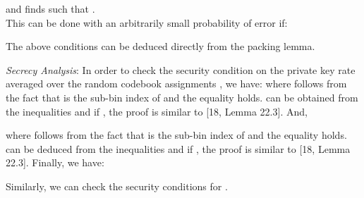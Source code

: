 \documentclass[conference,8pt]{IEEEtran}
\begin{document}
{{{{{{and finds  such that .\\
This can be done with an arbitrarily small probability of error if:

The above conditions can be deduced directly from the packing lemma.

\emph{Secrecy Analysis}: 
In order to check the security condition on the private key rate  averaged over the random codebook assignments , we have:
where  follows from the fact that  is the sub-bin index of  and the equality  holds.  can be obtained from the inequalities  and  if , the proof is similar to [18, Lemma 22.3]. And, 

where  follows from the fact that  is the sub-bin index of  and the equality  holds.  can be deduced from the inequalities  and  if , the proof is similar to [18, Lemma 22.3]. Finally, we have:

Similarly, we can check the security conditions for .






}
}}}}}
\end{document}
